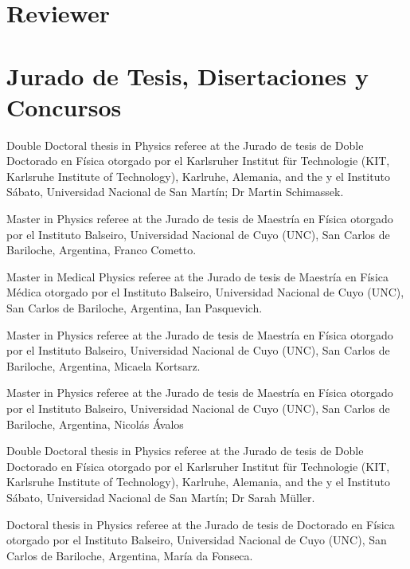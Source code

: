 

\ifeng
  \section*{Reviewer}
\else
  \section*{Jurado de Tesis, Disertaciones y Concursos}
\fi

\ifeng
Double Doctoral thesis in Physics referee at the
\else
Jurado de tesis de Doble Doctorado en Física otorgado por el
\fi
Karlsruher Institut für Technologie (KIT, Karlsruhe Institute of Technology), Karlruhe, Alemania, \ifeng and the \else y el \fi Instituto Sábato, Universidad Nacional de San Martín; Dr Martin Schimassek.

\ifeng
Master in Physics referee at the 
\else
Jurado de tesis de Maestría en Física otorgado por el
\fi
Instituto Balseiro, Universidad Nacional de Cuyo (UNC), San Carlos de Bariloche, Argentina, Franco Cometto. 

\ifeng
Master in Medical Physics referee at the 
\else
Jurado de tesis de Maestría en Física Médica otorgado por el
\fi
Instituto Balseiro, Universidad Nacional de Cuyo (UNC), San Carlos de Bariloche, Argentina, Ian Pasquevich. 

\ifeng
Master in Physics referee at the 
\else
Jurado de tesis de Maestría en Física otorgado por el
\fi
Instituto Balseiro, Universidad Nacional de Cuyo (UNC), San Carlos de Bariloche, Argentina, Micaela Kortsarz. 

\ifeng
Master in Physics referee at the 
\else
Jurado de tesis de Maestría en Física otorgado por el
\fi
Instituto Balseiro, Universidad Nacional de Cuyo (UNC), San Carlos de Bariloche, Argentina, Nicolás Ávalos

\ifeng
Double Doctoral thesis in Physics referee at the
\else
Jurado de tesis de Doble Doctorado en Física otorgado por el
\fi
Karlsruher Institut für Technologie (KIT, Karlsruhe Institute of Technology), Karlruhe, Alemania, \ifeng and the \else y el \fi Instituto Sábato, Universidad Nacional de San Martín; Dr Sarah Müller.

\ifeng
Doctoral thesis in Physics referee at the 
\else
Jurado de tesis de Doctorado en Física otorgado por el
\fi
Instituto Balseiro, Universidad Nacional de Cuyo (UNC), San Carlos de Bariloche, Argentina, María da Fonseca.

